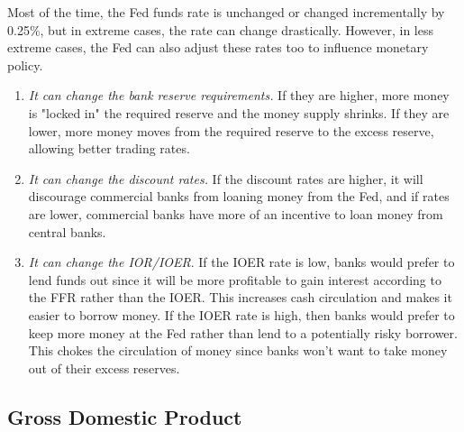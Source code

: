\documentclass{article}
\begin{document}
      \begin{definition}
        Most of the time, the Fed funds rate is unchanged or changed incrementally by 0.25\%, but in extreme cases, the rate can change drastically. However, in less extreme cases, the Fed can also adjust these rates too to influence monetary policy. 
        \begin{enumerate}
          \item \textit{It can change the bank reserve requirements.} If they are higher, more money is "locked in" the required reserve and the money supply shrinks. If they are lower, more money moves from the required reserve to the excess reserve, allowing better trading rates. 
          \item \textit{It can change the discount rates.} If the discount rates are higher, it will discourage commercial banks from loaning money from the Fed, and if rates are lower, commercial banks have more of an incentive to loan money from central banks. 
          \item \textit{It can change the IOR/IOER}. If the IOER rate is low, banks would prefer to lend funds out since it will be more profitable to gain interest according to the FFR rather than the IOER. This increases cash circulation and makes it easier to borrow money. If the IOER rate is high, then banks would prefer to keep more money at the Fed rather than lend to a potentially risky borrower. This chokes the circulation of money since banks won't want to take money out of their excess reserves. 
        \end{enumerate}
      \end{definition}

  \subsection{Gross Domestic Product}
\end{document}
